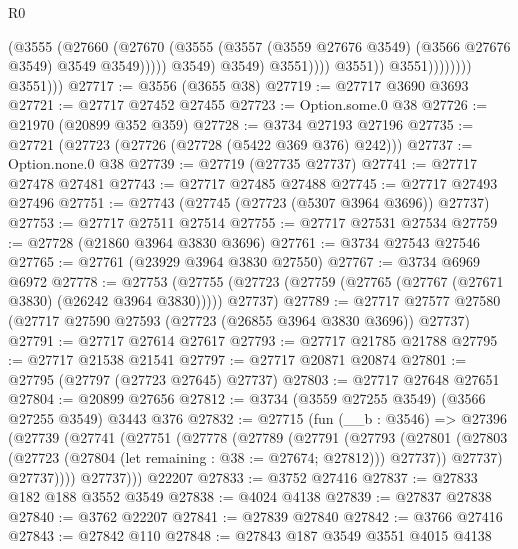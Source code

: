 \begin{lexlean}{R0}
\begin{coremodule}
                                          (@3555
                                            (@27660
                                              (@27670
                                                (@3555
                                                  (@3557
                                                    (@3559 @27676 @3549)
                                                    (@3566 @27676 @3549)
                                                    @3549
                                                    @3549)))))
                                          @3549)
                                        @3549)
                                      @3551))))
                              @3551))
                          @3551))))))))
          @3551)))
@27717 := @3556 (@3655 @38)
@27719 := @27717 @3690 @3693
@27721 := @27717 @27452 @27455
@27723 := Option.some.{0} @38
@27726 := @21970 (@20899 @352 @359)
@27728 := @3734 @27193 @27196
@27735 := @27721 (@27723 (@27726 (@27728 (@5422 @369 @376) @242)))
@27737 := Option.none.{0} @38
@27739 := @27719 (@27735 @27737)
@27741 := @27717 @27478 @27481
@27743 := @27717 @27485 @27488
@27745 := @27717 @27493 @27496
@27751 := @27743 (@27745 (@27723 (@5307 @3964 @3696)) @27737)
@27753 := @27717 @27511 @27514
@27755 := @27717 @27531 @27534
@27759 := @27728 (@21860 @3964 @3830 @3696)
@27761 := @3734 @27543 @27546
@27765 := @27761 (@23929 @3964 @3830 @27550)
@27767 := @3734 @6969 @6972
@27778 := @27753
    (@27755 (@27723 (@27759 (@27765 (@27767 (@27671 @3830) (@26242 @3964 @3830))))) @27737)
@27789 := @27717 @27577 @27580 (@27717 @27590 @27593 (@27723 (@26855 @3964 @3830 @3696)) @27737)
@27791 := @27717 @27614 @27617
@27793 := @27717 @21785 @21788
@27795 := @27717 @21538 @21541
@27797 := @27717 @20871 @20874
@27801 := @27795 (@27797 (@27723 @27645) @27737)
@27803 := @27717 @27648 @27651
@27804 := @20899 @27656
@27812 := @3734 (@3559 @27255 @3549) (@3566 @27255 @3549) @3443 @376
@27832 := @27715
    (fun (__b : @3546) =>
    @27396
      (@27739
        (@27741
          (@27751
            (@27778
              (@27789
                (@27791
                  (@27793
                    (@27801
                      (@27803 (@27723 (@27804 (let remaining : @38 := @27674; @27812))) @27737))
                    @27737)
                  @27737))))
          @27737)))
    @22207
@27833 := @3752 @27416
@27837 := @27833 @182 @188 @3552 @3549
@27838 := @4024 @4138
@27839 := @27837 @27838
@27840 := @3762 @22207
@27841 := @27839 @27840
@27842 := @3766 @27416
@27843 := @27842 @110
@27848 := @27843 @187 @3549 @3551 @4015 @4138

\end{coremodule}
\end{lexlean}
